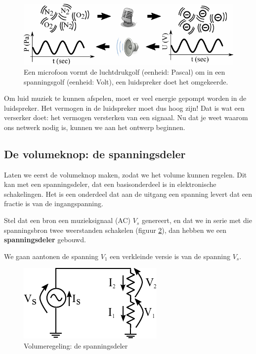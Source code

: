 \documentclass{article}
\begin{document}
			\begin{figure}[htbp]
				\centering
				\includegraphics[scale=1.2]{micro}
				\caption{Een microfoon vormt de luchtdrukgolf (eenheid: Pascal) om in een spanningsgolf (eenheid: Volt), een luidspreker doet het omgekeerde.}
				\label{fig:micro}
			\end{figure}

			Om luid muziek te kunnen afspelen, moet er veel energie gepompt worden in de luidspreker. Het vermogen in de luidspreker moet dus hoog zijn! Dat is wat een verserker doet: het vermogen versterken van een signaal. Nu dat je weet waarom ons netwerk nodig is, kunnen we aan het ontwerp beginnen.

		\subsection{De volumeknop: de spanningsdeler}

			Laten we eerst de volumeknop maken, zodat we het volume kunnen regelen. Dit kan met een spanningsdeler, dat een basisonderdeel is in elektronische schakelingen. Het is een onderdeel dat aan de uitgang een spanning levert dat een fractie is van de ingangspanning.

			 Stel dat een bron een muzieksignaal (AC) $V_s$ genereert, en dat we in serie met die spanningsbron twee weerstanden schakelen (figuur \ref{fig:volume}), dan hebben we een  \textbf{spanningsdeler} gebouwd. 

			 We gaan aantonen de spanning $V_1$ een verkleinde versie is van de spanning $V_s$.

			\begin{figure}[htbp]
				\centering
				\includegraphics{weerstandsdeler}
				\caption{Volumeregeling: de spanningsdeler}
				\label{fig:volume}
			\end{figure}
\end{document}
